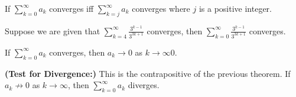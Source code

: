 \begin{itemize}
\begin{theorem}
    \end{theorem}
    \begin{theorem}
        If $\sum_{k=0}^{\infty} a_k$ converges iff $\sum_{k=j}^\infty a_k$ converges where $j$ is a positive integer.
    \end{theorem}
    \begin{example}
        Suppose we are given that $\sum_{k=4}^\infty \frac{3^{k-1}}{3^{3k+1}}$ converges, then $\sum_{k=0}^\infty \frac{3^{k-1}}{3^{3k+1}}$ converges.
    \end{example}
    \begin{theorem}
        If $\sum_{k=0}^\infty a_k$ converges, then $a_k \to 0$ as $k\to\infty0$. 
    \end{theorem}
    \begin{theorem}
        \textbf{(Test for Divergence:)} This is the contrapositive of the previous theorem. If $a_k \not\to 0$ as $k\to \infty$, then $\sum_{k=0}^\infty a_k$ diverges.
    \end{theorem}
\end{itemize}